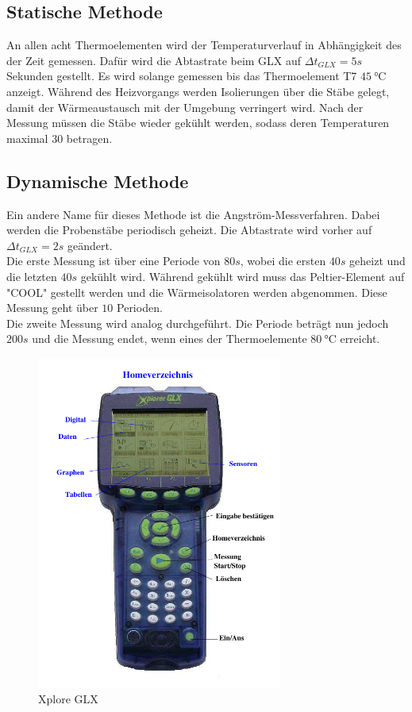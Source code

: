 \subsection{Statische Methode}
\label{subsec:durch_stat}
An allen acht Thermoelementen wird der Temperaturverlauf in Abhängigkeit des der Zeit gemessen.
Dafür wird die Abtastrate beim GLX auf $\Delta t_{GLX} = 5\si{s}$ Sekunden gestellt.
Es wird solange gemessen bis das Thermoelement T7 $\qty{45}{\degreeCelsius}$ anzeigt.
Während des Heizvorgangs werden Isolierungen über die Stäbe gelegt, damit der Wärmeaustausch mit der Umgebung verringert wird.
Nach der Messung müssen die Stäbe wieder gekühlt werden, sodass deren Temperaturen maximal $30$ betragen.

\subsection{Dynamische Methode}
\label{subsec:durch_dyn}
Ein andere Name für dieses Methode ist die Angström-Messverfahren.
Dabei werden die Probenstäbe periodisch geheizt.
Die Abtastrate wird vorher auf $\Delta t_{GLX} = 2\si{s}$ geändert.\\
Die erste Messung ist über eine Periode von $80\si{s}$, wobei die ersten $40\si{s}$ geheizt und die letzten $40\si{s}$ gekühlt wird.
Während gekühlt wird muss das Peltier-Element auf "COOL" gestellt werden und die Wärmeisolatoren werden abgenommen.
Diese Messung geht über $10$ Perioden.\\
Die zweite Messung wird analog durchgeführt. 
Die Periode beträgt nun jedoch $200 \si{s}$ und die Messung endet, wenn eines der Thermoelemente $\qty{80}{\degreeCelsius}$ erreicht.

\begin{figure}[H]
    \centering
    \includegraphics[height=11cm]{content/Abb_2.pdf}
    \caption{Xplore GLX\cite[5]{V204}}
    \label{fig:GLX}
\end{figure}

